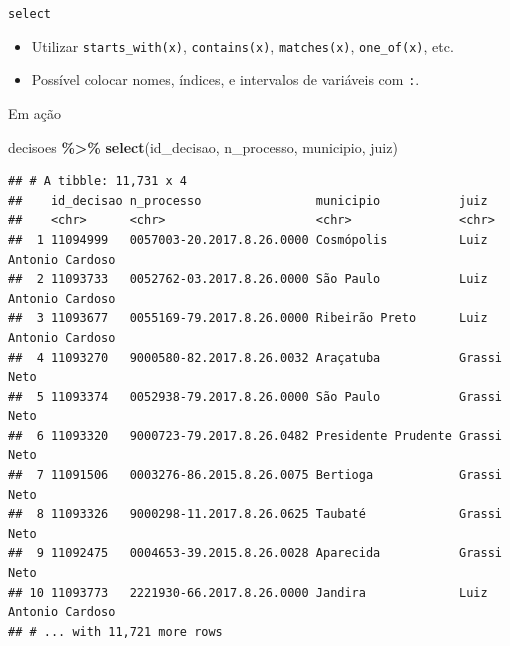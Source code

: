 \documentclass[
  10pt,
  ignorenonframetext,
]{beamer}
\newenvironment{Shaded}{\begin{snugshade}}{\end{snugshade}}
\newcommand{\KeywordTok}[1]{\textcolor[rgb]{0.13,0.29,0.53}{\textbf{#1}}}
\newcommand{\NormalTok}[1]{#1}
\newcommand{\OperatorTok}[1]{\textcolor[rgb]{0.81,0.36,0.00}{\textbf{#1}}}
\newcommand{\StringTok}[1]{\textcolor[rgb]{0.31,0.60,0.02}{#1}}
\providecommand{\tightlist}{%
  \setlength{\itemsep}{0pt}\setlength{\parskip}{0pt}}
\begin{document}
\begin{frame}[fragile]{\texttt{select}}
\protect\hypertarget{select-1}{}
\begin{itemize}
\tightlist
\item
  Utilizar \texttt{starts\_with(x)}, \texttt{contains(x)},
  \texttt{matches(x)}, \texttt{one\_of(x)}, etc.
\item
  Possível colocar nomes, índices, e intervalos de variáveis com
  \texttt{:}.
\end{itemize}
\end{frame}

\begin{frame}[fragile]{Em ação}
\protect\hypertarget{em-auxe7uxe3o}{}
\begin{Shaded}
\begin{Highlighting}[]
\NormalTok{decisoes }\OperatorTok{\%\textgreater{}\%}\StringTok{ }
\StringTok{  }\KeywordTok{select}\NormalTok{(id\_decisao, n\_processo, municipio, juiz)}
\end{Highlighting}
\end{Shaded}

\begin{verbatim}
## # A tibble: 11,731 x 4
##    id_decisao n_processo                municipio           juiz                
##    <chr>      <chr>                     <chr>               <chr>               
##  1 11094999   0057003-20.2017.8.26.0000 Cosmópolis          Luiz Antonio Cardoso
##  2 11093733   0052762-03.2017.8.26.0000 São Paulo           Luiz Antonio Cardoso
##  3 11093677   0055169-79.2017.8.26.0000 Ribeirão Preto      Luiz Antonio Cardoso
##  4 11093270   9000580-82.2017.8.26.0032 Araçatuba           Grassi Neto         
##  5 11093374   0052938-79.2017.8.26.0000 São Paulo           Grassi Neto         
##  6 11093320   9000723-79.2017.8.26.0482 Presidente Prudente Grassi Neto         
##  7 11091506   0003276-86.2015.8.26.0075 Bertioga            Grassi Neto         
##  8 11093326   9000298-11.2017.8.26.0625 Taubaté             Grassi Neto         
##  9 11092475   0004653-39.2015.8.26.0028 Aparecida           Grassi Neto         
## 10 11093773   2221930-66.2017.8.26.0000 Jandira             Luiz Antonio Cardoso
## # ... with 11,721 more rows
\end{verbatim}
\end{frame}
\end{document}
